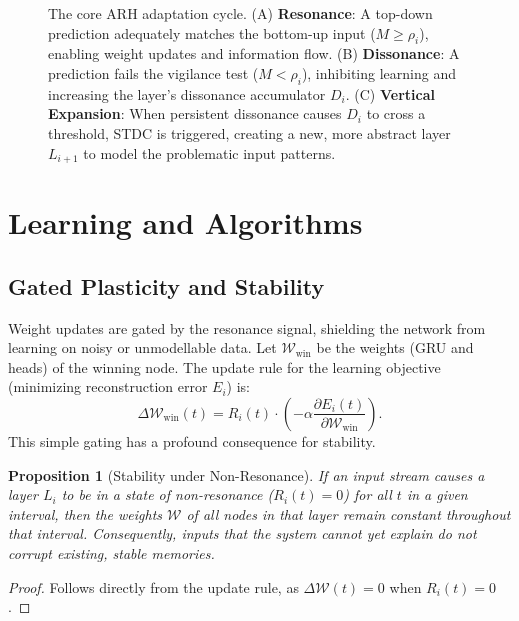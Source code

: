 \documentclass{article}
\newtheorem{proposition}[theorem]{Proposition}
\begin{document}
\begin{figure}[h!]
    \caption{The core ARH adaptation cycle. (A) \textbf{Resonance}: A top-down prediction adequately matches the bottom-up input ($M \ge \rho_i$), enabling weight updates and information flow. (B) \textbf{Dissonance}: A prediction fails the vigilance test ($M < \rho_i$), inhibiting learning and increasing the layer's dissonance accumulator $D_i$. (C) \textbf{Vertical Expansion}: When persistent dissonance causes $D_i$ to cross a threshold, STDC is triggered, creating a new, more abstract layer $L_{i+1}$ to model the problematic input patterns.}
    \label{fig:arh_diagram}
\end{figure}

\section{Learning and Algorithms}
\subsection{Gated Plasticity and Stability}
Weight updates are gated by the resonance signal, shielding the network from learning on noisy or unmodellable data. Let $\mathcal{W}_{\text{win}}$ be the weights (GRU and heads) of the winning node. The update rule for the learning objective (minimizing reconstruction error $E_i$) is:
\begin{equation}
    \Delta \mathcal{W}_{\text{win}}(t) = R_i(t) \cdot \left(-\alpha \frac{\partial E_i(t)}{\partial \mathcal{W}_{\text{win}}}\right).
\end{equation}
This simple gating has a profound consequence for stability.

\begin{proposition}[Stability under Non-Resonance]
If an input stream causes a layer $L_i$ to be in a state of non-resonance ($R_i(t)=0$) for all $t$ in a given interval, then the weights $\mathcal{W}$ of all nodes in that layer remain constant throughout that interval. Consequently, inputs that the system cannot yet explain do not corrupt existing, stable memories.
\end{proposition}
\begin{proof}
Follows directly from the update rule, as $\Delta\mathcal{W}(t)=0$ when $R_i(t)=0$.
\end{proof}
\end{document}
